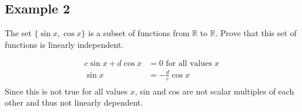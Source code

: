 \documentclass{article}
\theoremstyle{mytheoremstyle}
\theoremstyle{mytheoremstyle}
\theoremstyle{myproblemstyle}
\begin{document}
    \subsection*{Example 2}
    The set $\{\sin x, \cos x\}$ is a subset of functions from $\mathbb{R}$ to
    $\mathbb{R}$. Prove that this set of functions is linearly independent.

    \begin{align*}
        c \sin x + d \cos x &= 0 \text{ for all values } x \\
        \sin x &= -\frac{d}{c} \cos x \\
    \end{align*}
    Since this is not true for all values $x$, sin and cos are not scalar
    multiples of each other and thus not linearly dependent.
\end{document}
